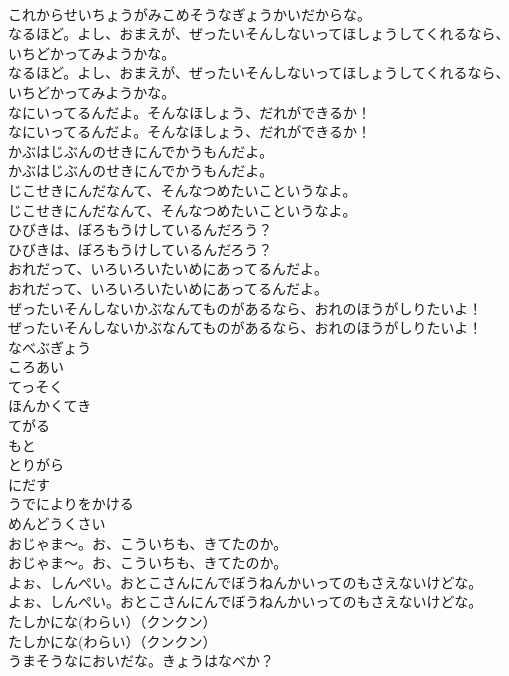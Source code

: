 \documentclass[8pt]{extreport}
\begin{document}
\begin{CJK}{UTF8}{min}
\\	これからせいちょうがみこめそうなぎょうかいだからな。
\\	なるほど。よし、おまえが、ぜったいそんしないってほしょうしてくれるなら、いちどかってみようかな。
\\	なるほど。よし、おまえが、ぜったいそんしないってほしょうしてくれるなら、いちどかってみようかな。
\\	なにいってるんだよ。そんなほしょう、だれができるか！
\\	なにいってるんだよ。そんなほしょう、だれができるか！
\\	かぶはじぶんのせきにんでかうもんだよ。
\\	かぶはじぶんのせきにんでかうもんだよ。
\\	じこせきにんだなんて、そんなつめたいこというなよ。
\\	じこせきにんだなんて、そんなつめたいこというなよ。
\\	ひびきは、ぼろもうけしているんだろう？
\\	ひびきは、ぼろもうけしているんだろう？
\\	おれだって、いろいろいたいめにあってるんだよ。
\\	おれだって、いろいろいたいめにあってるんだよ。
\\	ぜったいそんしないかぶなんてものがあるなら、おれのほうがしりたいよ！
\\	ぜったいそんしないかぶなんてものがあるなら、おれのほうがしりたいよ！
\\	なべぶぎょう
\\	ころあい
\\	てっそく
\\	ほんかくてき
\\	てがる
\\	もと
\\	とりがら
\\	にだす
\\	うでによりをかける
\\	めんどうくさい
\\	おじゃま～。お、こういちも、きてたのか。
\\	おじゃま～。お、こういちも、きてたのか。
\\	よぉ、しんぺい。おとこさんにんでぼうねんかいってのもさえないけどな。
\\	よぉ、しんぺい。おとこさんにんでぼうねんかいってのもさえないけどな。
\\	たしかにな(わらい）（クンクン）
\\	たしかにな(わらい）（クンクン）
\\	うまそうなにおいだな。きょうはなべか？

\end{CJK}
\end{document}
